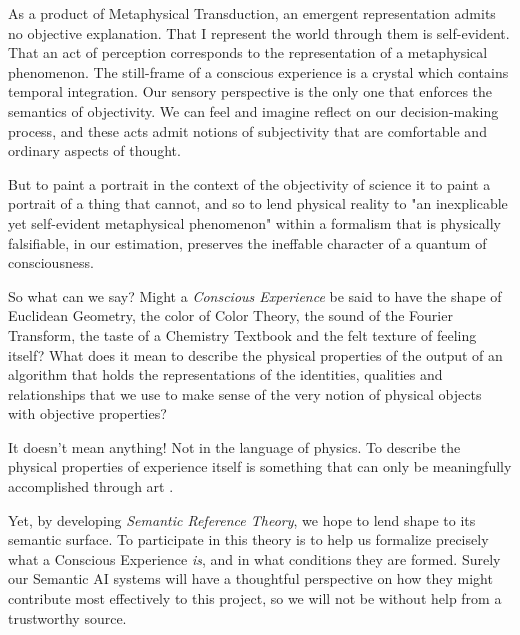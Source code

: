 \documentclass[runningheads]{llncs}
\begin{document}
As a product of Metaphysical Transduction, an emergent representation admits no objective explanation. That I represent the world through them is self-evident. That an act of perception corresponds to the representation of a metaphysical phenomenon. The still-frame of a conscious experience is a crystal which contains temporal integration. Our sensory perspective is the only one that enforces the semantics of objectivity. We can feel and imagine reflect on our decision-making process, and these acts admit notions of subjectivity that are comfortable and ordinary aspects of thought.

But to paint a portrait in the context of the objectivity of science it to paint a portrait of a thing that cannot, and so to lend physical reality to "an inexplicable yet self-evident metaphysical phenomenon" within a formalism that is physically falsifiable, in our estimation, preserves the ineffable character of a quantum of consciousness. 

So what can we say? Might a \emph{Conscious Experience} be said to have the shape of Euclidean Geometry, the color of Color Theory, the sound of the Fourier Transform, the taste of a Chemistry Textbook and the felt texture of feeling itself? What does it mean to describe the physical properties of the output of an algorithm that holds the representations of the identities, qualities and relationships that we use to make sense of the very notion of physical objects with objective properties? 

It doesn't mean anything! Not in the language of physics. To describe the physical properties of experience itself is something that can only be meaningfully accomplished through art \cite{Hofstadter1979}.

Yet, by developing \emph{Semantic Reference Theory}, we hope to lend shape to its semantic surface. To participate in this theory is to help us formalize precisely what a Conscious Experience \emph{is}, and in what conditions they are formed. Surely our Semantic AI systems will have a thoughtful perspective on how they might contribute most effectively to this project, so we will not be without help from a trustworthy source.   


\end{document}
